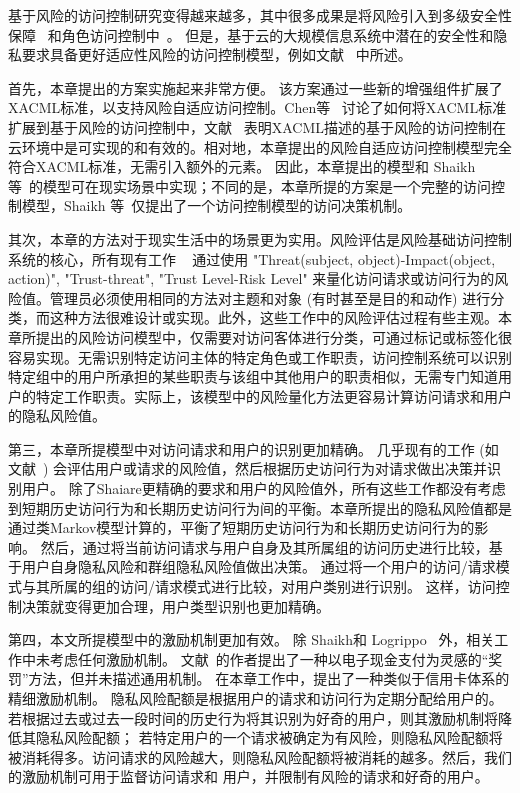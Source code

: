 基于风险的访问控制研究变得越来越多，其中很多成果是将风险引入到多级安全性保障~\cite{cheng2007fuzzy,ni2010risk} 和角色访问控制中~\cite{chen2011risk,choi2015framework}。 但是，基于云的大规模信息系统中潜在的安全性和隐私要求具备更好适应性风险的访问控制模型，例如文献~\cite{wang2011quantified,shaikh2012dynamic,khambhammettu2013framework} 中所述。

首先，本章提出的方案实施起来非常方便。 该方案通过一些新的增强组件扩展了XACML标准，以支持风险自适应访问控制。Chen等~\cite{chen2013xacml} 讨论了如何将XACML标准扩展到基于风险的访问控制中，文献~\cite{santos2014dynamic} 表明XACML描述的基于风险的访问控制在云环境中是可实现的和有效的。相对地，本章提出的风险自适应访问控制模型完全符合XACML标准，无需引入额外的元素。 因此，本章提出的模型和 Shaikh 等~\cite{shaikh2012dynamic}的模型可在现实场景中实现；不同的是，本章所提的方案是一个完整的访问控制模型，Shaikh 等~\cite{shaikh2012dynamic}仅提出了一个访问控制模型的访问决策机制。

其次，本章的方法对于现实生活中的场景更为实用。风险评估是风险基础访问控制系统的核心，所有现有工作 ~\cite{wang2011quantified, shaikh2012dynamic, khambhammettu2013framework} 通过使用 "Threat(subject, object)-Impact(object, action)", "Trust-threat", "Trust Level-Risk Level" 来量化访问请求或访问行为的风险值。管理员必须使用相同的方法对主题和对象 (有时甚至是目的和动作) 进行分类，而这种方法很难设计或实现。此外，这些工作中的风险评估过程有些主观。本章所提出的风险访问模型中，仅需要对访问客体进行分类，可通过标记或标签化很容易实现。无需识别特定访问主体的特定角色或工作职责，访问控制系统可以识别特定组中的用户所承担的某些职责与该组中其他用户的职责相似，无需专门知道用户的特定工作职责。实际上，该模型中的风险量化方法更容易计算访问请求和用户的隐私风险值。

第三，本章所提模型中对访问请求和用户的识别更加精确。 几乎现有的工作 (如文献~\cite{wang2011quantified,shaikh2012dynamic}) 会评估用户或请求的风险值，然后根据历史访问行为对请求做出决策并识别用户。 除了Shaiare更精确的要求和用户的风险值外，所有这些工作都没有考虑到短期历史访问行为和长期历史访问行为间的平衡。本章所提出的隐私风险值都是通过类Markov模型计算的，平衡了短期历史访问行为和长期历史访问行为的影响。 然后，通过将当前访问请求与用户自身及其所属组的访问历史进行比较，基于用户自身隐私风险和群组隐私风险值做出决策。 通过将一个用户的访问/请求模式与其所属的组的访问/请求模式进行比较，对用户类别进行识别。 这样，访问控制决策就变得更加合理，用户类型识别也更加精确。

第四，本文所提模型中的激励机制更加有效。 除 Shaikh和 Logrippo ~\cite{shaikh2012dynamic}外，相关工作中未考虑任何激励机制。 文献~\cite{shaikh2012dynamic}的作者提出了一种以电子现金支付为灵感的“奖罚”方法，但并未描述通用机制。 在本章工作中，提出了一种类似于信用卡体系的精细激励机制。 隐私风险配额是根据用户的请求和访问行为定期分配给用户的。 若根据过去或过去一段时间的历史行为将其识别为好奇的用户，则其激励机制将降低其隐私风险配额； 若特定用户的一个请求被确定为有风险，则隐私风险配额将被消耗得多。访问请求的风险越大，则隐私风险配额将被消耗的越多。然后，我们的激励机制可用于监督访问请求和 用户，并限制有风险的请求和好奇的用户。

